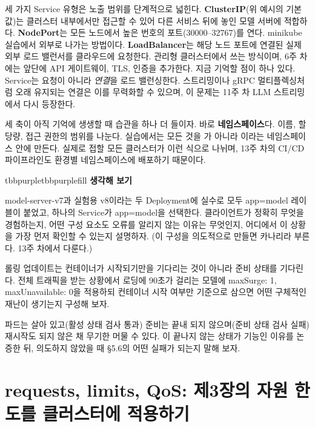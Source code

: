 세 가지 Service 유형은 노출 범위를 단계적으로 넓힌다. \textbf{ClusterIP}(위 예시의 기본값)는 클러스터 내부에서만 접근할 수 있어 다른 서비스 뒤에 놓인 모델 서버에 적합하다. \textbf{NodePort}는 모든 노드에서 높은 번호의 포트(30000–32767)를 연다. minikube 실습에서 외부로 나가는 방법이다. \textbf{LoadBalancer}는 해당 노드 포트에 연결된 실제 외부 로드 밸런서를 클라우드에 요청한다. 관리형 클러스터에서 쓰는 방식이며, 6주 차에는 앞단에 API 게이트웨이, TLS, 인증을 추가한다. 지금 기억할 점이 하나 있다. Service는 요청이 아니라 \textit{연결}을 로드 밸런싱한다. 스트리밍이나 gRPC 멀티플렉싱처럼 오래 유지되는 연결은 이를 무력화할 수 있으며, 이 문제는 11주 차 LLM 스트리밍에서 다시 등장한다.

세 축이 아직 기억에 생생할 때 습관을 하나 더 들이자. 바로 \textbf{네임스페이스}다. 이름, 할당량, 접근 권한의 범위를 나눈다. 실습에서는 모든 것을 가 아니라 이라는 네임스페이스 안에 만든다. 실제로 접할 모든 클러스터가 이런 식으로 나뉘며, 13주 차의 CI/CD 파이프라인도 환경별 네임스페이스에 배포하기 때문이다.

\begin{calloutbox}{tbbpurple}{tbbpurplefill}
{\normalsize\bfseries\color{tbbpurple}생각해 보기}\par\vspace{3pt}
\begin{tbbitemize}
  \item model-server-v7과 실험용 v8이라는 두 Deployment에 실수로 모두 app=model 레이블이 붙었고, 하나의 Service가 app=model을 선택한다. 클라이언트가 정확히 무엇을 경험하는지, 어떤 구성 요소도 오류를 알리지 않는 이유는 무엇인지, 어디에서 이 상황을 가장 먼저 확인할 수 있는지 설명하자. (이 구성을 의도적으로 만들면 카나리라 부른다. 13주 차에서 다룬다.)
  \item 롤링 업데이트는 컨테이너가 시작되기만을 기다리는 것이 아니라 준비 상태를 기다린다. 전체 트래픽을 받는 상황에서 로딩에 90초가 걸리는 모델에 maxSurge: 1, maxUnavailable: 0을 적용하되 컨테이너 시작 여부만 기준으로 삼으면 어떤 구체적인 재난이 생기는지 구성해 보자.
  \item 파드는 살아 있고(활성 상태 검사 통과) 준비는 끝내 되지 않으며(준비 상태 검사 실패) 재시작도 되지 않은 채 무기한 머물 수 있다. 이 끝나지 않는 상태가 기능인 이유를 논증한 뒤, 의도하지 않았을 때 §5.6의 어떤 실패가 되는지 말해 보자.
\end{tbbitemize}
\end{calloutbox}

\section{requests, limits, QoS: 제3장의 자원 한도를 클러스터에 적용하기}

